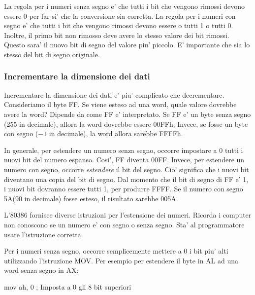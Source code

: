 La regola per i numeri senza segno e' che tutti i bit che vengono rimossi
devono essere 0 per far si' che la conversione sia corretta. La regola
per i numeri con segno e' che tutti i bit che vengono rimossi devono
essere o tutti 1 o tutti 0. Inoltre, il primo bit non rimosso deve 
avere lo stesso valore dei bit rimossi. Questo sara' il nuovo bit di 
segno del valore piu' piccolo. E' importante che sia lo stesso
del bit di segno originale.  

\subsubsection{Incrementare la dimensione dei dati}

Incrementare la dimensione dei dati e' piu' complicato che decrementare.
Consideriamo il byte FF. Se viene esteso ad una word, quale valore
dovrebbe avere la word? Dipende da come FF e' interpretato. Se FF e'
un byte senza segno (255 in decimale), allora la word dovrebbe essere
00FFh; Invece, se fosse un byte con segno ($-1$ in decimale), la word
allora sarebbe FFFFh.

In generale, per estendere un numero senza segno, occorre impostare a
0 tutti i nuovi bit del numero espanso. Cosi', FF diventa 00FF. Invece,
per estendere un numero con segno, occorre \emph{estendere} il bit del
segno. Cio' significa che i nuovi bit diventano
una copia del bit di segno. Dal momento che il bit di segno di FF e' 1, i
nuovi bit dovranno essere tutti 1, per produrre FFFF. Se il numero con
segno 5A(90 in decimale) fosse esteso, il risultato sarebbe 005A.

L'80386 fornisce diverse istruzioni per l'estensione dei numeri. Ricorda 
i computer non conoscono se un numero e' con segno o senza segno. Sta'
al programmatore usare l'istruzione corretta.

Per i numeri senza segno, occorre semplicemente mettere a 0 i bit piu' 
alti utilizzando l'istruzione {\code MOV}. Per esempio per estendere
il byte in AL ad una word senza segno in AX:
\begin{AsmCodeListing}[numbers=none,frame=none]
      mov    ah, 0   ; Imposta a 0 gli 8 bit superiori
\end{AsmCodeListing}

